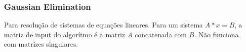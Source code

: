 \divisor
\subsubsection{Gaussian Elimination}
Para resolu\c{c}\~{a}o de sistemas de equa\c{c}\~{o}es lineares. Para um sistema $A*x = B$, a matriz de input do algor\'{i}tmo \'{e} a matriz $A$ concatenada com $B$.
N\~{a}o funciona com matrizes singulares.
\divisor
